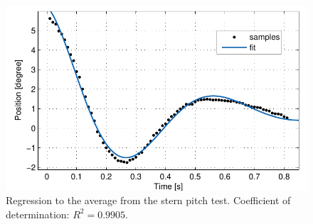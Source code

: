 \begin{figure}[H]
	\centering
	\includegraphics{plot/gns_ps}
	\caption{Regression to the average from the stern pitch test. Coefficient of determination: $R^2 = 0.9905$.}
	\label{fig:gnsps}
\end{figure}

\newpage
